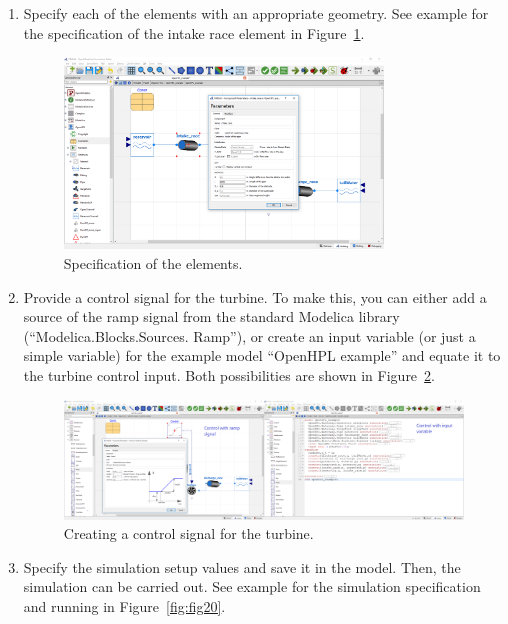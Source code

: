 \documentclass[%
]{USN-PhD}
\begin{document}
\begin{enumerate}
    \item Specify each of the elements with an appropriate geometry. See example for the specification of the intake race element in Figure~\ref{fig:fig18}.
    \begin{figure}[ht]
    \begin{center}
    \includegraphics[width=0.8\textwidth]{fig/Exam_4} %
    \caption{Specification of the elements.}
    \label{fig:fig18}
    \end{center}
    \end{figure}
    \item Provide a control signal for the turbine. To make this, you can either add a source of the ramp signal from the standard Modelica library (``Modelica.Blocks.Sources. Ramp''), or create an input variable (or just a simple variable) for the example model ``OpenHPL example'' and equate it to the turbine control input. Both possibilities are shown in Figure~\ref{fig:fig19}.\label{example_control}
    \begin{figure}
    \begin{center}
    \includegraphics[width=1\textwidth]{fig/Exam_5} %
    \caption{Creating a control signal for the turbine.}
    \label{fig:fig19}
    \end{center}
    \end{figure}
    \item Specify the simulation setup values and save it in the model. Then, the simulation can be carried out. See example for the simulation specification and running in Figure~\ref{fig:fig20}.

\end{enumerate}
\end{document}
